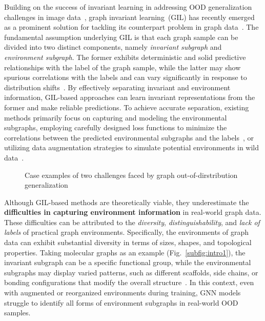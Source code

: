 Building on the success of invariant learning in addressing OOD generalization challenges in image data~\citep{creager2021environment,ye2022ood}, graph invariant learning~(GIL) has recently emerged as a prominent solution for tackling its counterpart problem in graph data~\citep{li2022learning,fan2022debiasing,miao2022interpretable,wu2022discovering}. The fundamental assumption underlying GIL is that each graph sample can be divided into two distinct components, namely \textit{invariant subgraph} and \textit{environment subgraph}. The former exhibits deterministic and solid predictive relationships with the label of the graph sample, while the latter may show spurious correlations with the labels and can vary significantly in response to distribution shifts~\citep{yang2022learning,chen2024does}. By effectively separating invariant and environment information,  GIL-based approaches can learn invariant representations from the former and make reliable predictions. To achieve accurate separation, existing methods primarily focus on capturing and modeling the environmental subgraphs, employing carefully designed loss functions to minimize the correlations between the predicted environmental subgraphs and the labels~\citep{gui2024joint,piao2024improving}, or utilizing data augmentation strategies to simulate potential environments in wild data~\citep{wu2022handling,jia2024graph}.
\begin{figure}[t!]   

 \centering
\vspace{-5mm}
\caption{Case examples of two challenges faced by graph out-of-dirstribution generalization}
\vspace{-8mm}
\label{fig:moti}
\end{figure}
Although GIL-based methods are theoretically viable, they underestimate the \textbf{difficulties in capturing environment information} in real-world graph data. These difficulties can be attributed to the \textit{diversity}, \textit{distinguishability}, and \textit{lack of labels} of practical graph environments. 
Specifically, the environments of graph data can exhibit substantial diversity in terms of sizes, shapes, and topological properties. Taking molecular graphs as an example (Fig.~\ref{subfig:intro1}), the invariant subgraph can be a specific functional group, while the environmental subgraphs may display varied patterns, such as different scaffolds, side chains, or bonding configurations that modify the overall structure~\citep{zhuang2023learning}. In this context, even with augmented or reorganized environments during training, GNN models struggle to identify all forms of environment subgraphs in real-world OOD samples. 
